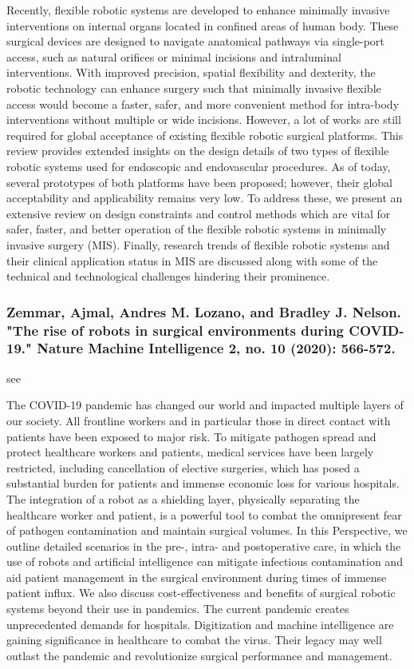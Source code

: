 \documentclass[conference]{IEEEtran}
\begin{document}
Recently, flexible robotic systems are developed to enhance minimally invasive interventions on internal organs located in confined areas of human body. These surgical devices are designed to navigate anatomical pathways via single-port access, such as natural orifices or minimal incisions and intraluminal interventions. With improved precision, spatial flexibility and dexterity, the robotic technology can enhance surgery such that minimally invasive flexible access would become a faster, safer, and more convenient method for intra-body interventions without multiple or wide incisions. However, a lot of works are still required for global acceptance of existing flexible robotic surgical platforms. This review provides extended insights on the design details of two types of flexible robotic systems used for endoscopic and endovascular procedures. As of today, several prototypes of both platforms have been proposed; however, their global acceptability and applicability remains very low. To address these, we present an extensive review on design constraints and control methods which are vital for safer, faster, and better operation of the flexible robotic systems in minimally invasive surgery (MIS). Finally, research trends of flexible robotic systems and their clinical application status in MIS are discussed along with some of the technical and technological challenges hindering their prominence.

\medskip
\subsubsection{Zemmar, Ajmal, Andres M. Lozano, and Bradley J. Nelson. "The rise of robots in surgical environments during COVID-19." Nature Machine Intelligence 2, no. 10 (2020): 566-572.}
see \cite{zemmar2020rise}

The COVID-19 pandemic has changed our world and impacted multiple layers of our society. All frontline workers and in particular those in direct contact with patients have been exposed to major risk. To mitigate pathogen spread and protect healthcare workers and patients, medical services have been largely restricted, including cancellation of elective surgeries, which has posed a substantial burden for patients and immense economic loss for various hospitals. The integration of a robot as a shielding layer, physically separating the healthcare worker and patient, is a powerful tool to combat the omnipresent fear of pathogen contamination and maintain surgical volumes. In this Perspective, we outline detailed scenarios in the pre-, intra- and postoperative care, in which the use of robots and artificial intelligence can mitigate infectious contamination and aid patient management in the surgical environment during times of immense patient influx. We also discuss cost-effectiveness and benefits of surgical robotic systems beyond their use in pandemics. The current pandemic creates unprecedented demands for hospitals. Digitization and machine intelligence are gaining significance in healthcare to combat the virus. Their legacy may well outlast the pandemic and revolutionize surgical performance and management.
\end{document}
